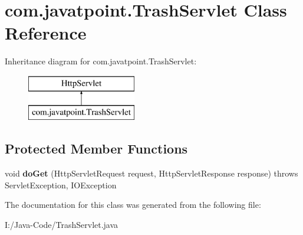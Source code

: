 \hypertarget{classcom_1_1javatpoint_1_1_trash_servlet}{}\section{com.\+javatpoint.\+Trash\+Servlet Class Reference}
\label{classcom_1_1javatpoint_1_1_trash_servlet}
Inheritance diagram for com.\+javatpoint.\+Trash\+Servlet\+:\begin{figure}[H]
\begin{center}
\leavevmode
\includegraphics[height=2.000000cm]{classcom_1_1javatpoint_1_1_trash_servlet}
\end{center}
\end{figure}
\subsection*{Protected Member Functions}
\begin{DoxyCompactItemize}
\item 
\mbox{\label{classcom_1_1javatpoint_1_1_trash_servlet_a3cb5d2f6214c56738ef500bacd13f617}} 
void {\bfseries do\+Get} (Http\+Servlet\+Request request, Http\+Servlet\+Response response)  throws Servlet\+Exception, I\+O\+Exception 
\end{DoxyCompactItemize}


The documentation for this class was generated from the following file\+:\begin{DoxyCompactItemize}
\item 
I\+:/\+Java-\/\+Code/Trash\+Servlet.\+java\end{DoxyCompactItemize}
